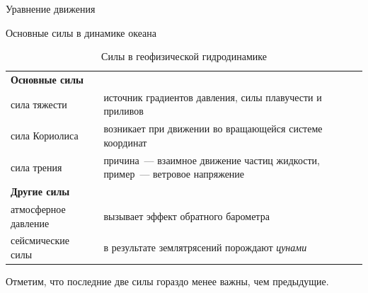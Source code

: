 \begin{chapter}{Уравнение движения}
\begin{section}{Основные силы в динамике океана}
\begin{table}
\caption{Силы в геофизической гидродинамике}\label{tbl:7.2}
\begin{tabular}{lp{}}
\hline
\textbf{Основные силы} \\
сила тяжести   & источник градиентов давления, силы плавучести и приливов\\
сила Кориолиса & возникает при движении во вращающейся системе координат\\
сила трения    & причина~--- взаимное движение частиц жидкости, 
                 пример~--- ветровое напряжение\\
\textbf{Другие силы} \\
атмосферное давление & вызывает эффект обратного барометра\\
сейсмические силы    & в результате землятрясений порождают \emph{цунами}\\
\hline
\end{tabular}
Отметим, что последние две силы гораздо менее важны, чем предыдущие.
\end{table}
%
\end{section}


\end{chapter}
